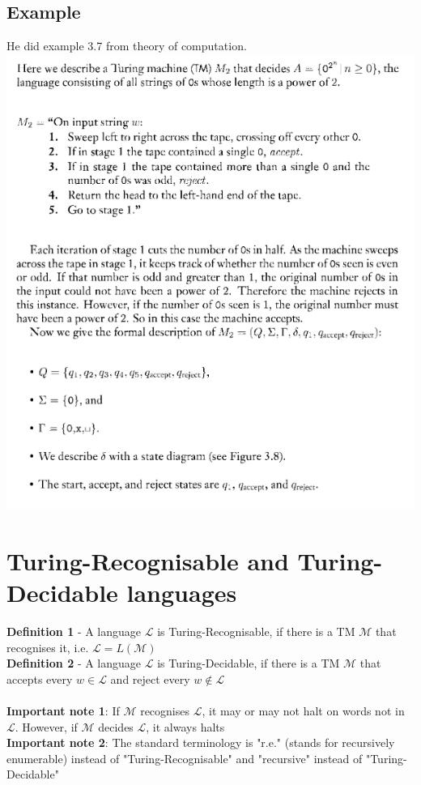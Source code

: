 \documentclass{article}[18pt]
\begin{document}
\subsection{Example}
He did example 3.7 from theory of computation.\\
\includegraphics[scale=0.7]{Example}

\section{Turing-Recognisable and Turing-Decidable languages}
\textbf{Definition 1} - A language $\mathscr{L}$ is Turing-Recognisable, if there is a TM $\mathscr{M}$ that recognises it, i.e. $\mathscr{L}=L(\mathscr{M})$\\
\textbf{Definition 2} - A language $\mathscr{L}$ is Turing-Decidable, if there is a TM $\mathscr{M}$ that accepts every $w\in\mathscr{L}$ and reject every $w\notin \mathscr{L}$\\
\\
\textbf{Important note 1}: If $\mathscr{M}$ recognises $\mathscr{L}$, it may or may not halt on words not in $\mathscr{L}$. However, if $\mathscr{M}$ decides $\mathscr{L}$, it always halts\\
\textbf{Important note 2}: The standard terminology is "r.e." (stands for recursively enumerable) instead of "Turing-Recognisable" and "recursive" instead of "Turing-Decidable"
\end{document}
